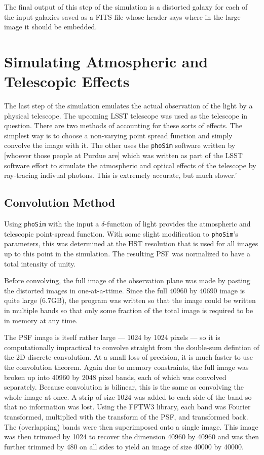 \documentclass[10pt,twoside]{article}
\theoremstyle{definition}
\theoremstyle{exercise}
\begin{document}
The final output of this step of the simulation is a distorted galaxy for each of the input galaxies saved as a FITS file whose header says where in the large image it should be embedded.

\section{Simulating Atmospheric and Telescopic Effects}
\label{sec:atmospherics}
The last step of the simulation emulates the actual observation of the light by a physical telescope. The upcoming LSST telescope was used as the telescope in question. There are two methods of accounting for these sorts of effects. The simplest way is to choose a non-varying point spread function and simply convolve the image with it. The other uses the \texttt{phoSim} software written by [whoever those people at Purdue are] which was written as part of the LSST software effort to simulate the atmospheric and optical effects of the telescope by ray-tracing indivual photons. This is extremely accurate, but much slower.'

\subsection{Convolution Method}
Using \texttt{phoSim} with the input a $\delta$-function of light provides the atmospheric and telescopic point-spread function. With some slight modification to \texttt{phoSim}'s parameters, this was determined at the HST resolution that is used for all images up to this point in the simulation. The resulting PSF was normalized to have a total intensity of unity.

Before convolving, the full image of the observation plane was made by pasting the distorted images in one-at-a-ttime. Since the full 40960 by 40690 image is quite large (6.7GB), the program was written so that the image could be written in multiple bands so that only some fraction of the total image is required to be in memory at any time.

The PSF image is itself rather large --- 1024 by 1024 pixels --- so it is computationally impractical to convolve straight from the double-sum defintion of the 2D discrete convolution. At a small loss of precision, it is much faster to use the convolution theorem. Again due to memory constraints, the full image was broken up into 40960 by 2048 pixel bands, each of which was convolved separately. Because convolution is bilinear, this is the same as convolving the whole image at once. A strip of size 1024 was added to each side of the band so that no information was lost. Using the FFTW3 library, each band was Fourier transformed, multiplied with the transform of the PSF, and transformed back. The (overlapping) bands were then superimposed onto a single image. This image was then trimmed by 1024 to recover the dimension 40960 by 40960 and was then further trimmed by 480 on all sides to yield an image of size 40000 by 40000. 
\end{document}
